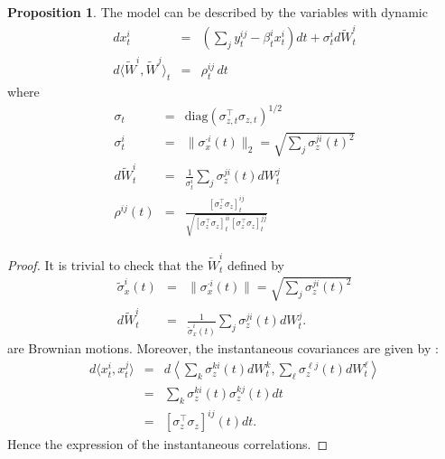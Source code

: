 \documentclass[11pt,english]{amsart}
\newcommand{\diag}{\mathrm{diag}}
\newcommand{\vun}{\mathbf{1}}
\theoremstyle{definition}
\newtheorem{prop}{Proposition}
\begin{document}
\begin{prop}
The model can be described by the variables 
with dynamic 
\begin{eqnarray}
  dx^i_t &=& \left(\sum_j y^{ij}_t - \beta^i_tx^i_t\right)dt + \sigma^i_{t}  d\widetilde{W}_t^i \\   
  d\langle \widetilde{W}^i, \widetilde{W}^j \rangle_t  &=& \rho^{ij}_t \,dt 
\end{eqnarray}
where
\begin{eqnarray}
  \sigma_{t} &=& \diag(\sigma_{z,t}^{\top}\sigma_{z,t})^{1/2} \\
  \sigma_t^i  &=& \| \sigma_x^{\cdot i}(t)\|_2 = \sqrt{ \sum_j \sigma_{z}^{ji}(t)^2 } \\
  d\widetilde{W}_t^i   &=& \frac{1}{ \sigma_{t}^i } \sum_j \sigma_{z}^{ji}(t)  dW_t^j   \\
  \rho^{ij}(t) 
  &=& \frac{[\sigma_{z}^\top\sigma_{z}]^{ij}_t}{\sqrt{[\sigma_{z}^\top\sigma_{z}]^{ii}_t[\sigma_{z}^\top\sigma_{z}]^{jj}_t}} 
\end{eqnarray}
\end{prop}

\begin{proof}
It is trivial to check that the $\widetilde{W}_t^i$ defined by 
\begin{eqnarray}
  \widetilde{\sigma}_x^i(t)  &=& \| \sigma_x^{\cdot i}(t)\| = \sqrt{ \sum_j \sigma_{z}^{ji}(t)^2 } \\
  d\widetilde{W}_t^i   &=& \frac{1}{ \widetilde{\sigma}_x^i(t) } \sum_j \sigma_{z}^{ji}(t)  dW_t^j   .
\end{eqnarray}
are Brownian motions. Moreover, the instantaneous covariances are given by :
\begin{eqnarray}
  d\langle x^i_t,x^j_t\rangle &=& d\left\langle \sum_k \sigma_{z}^{ki}(t) dW_t^k, \sum_\ell \sigma_{z}^{\ell j}(t) dW_t^\ell \right\rangle     \\
  &=& \sum_k \sigma_{z}^{ki}(t) \sigma_{z}^{kj}(t) dt \\
  &=& [\sigma_{z}^\top\sigma_{z}]^{ij}(t)dt. 
\end{eqnarray}
Hence the expression of the instantaneous correlations.
\end{proof}
\end{document}
